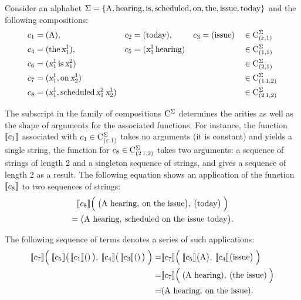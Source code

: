 \documentclass[../../document.tex]{subfiles}
\begin{document}
    \begin{example}\label{ex:lcfrs:comp}
        Consider an alphabet \(\Sigma=\{\text{A}, \text{hearing}, \text{is}, \text{scheduled}, \text{on}, \text{the}, \text{issue}, \text{today}\}\) and the following compositions:
        \begin{align*}
            c_1 &= (\text{A}), & c_2 &= (\text{today}), & c_3 &= (\text{issue}) && \in \mathrm{C}^\Sigma_{(\varepsilon, 1)} \\
            c_4 &= (\text{the} \, \textsl{x}_1^1), & c_5 &= (\textsl{x}_1^1 \, \text{hearing}) & & && \in \mathrm{C}^\Sigma_{(1,1)} \\
            c_6 &= (\textsl{x}_1^1 \, \text{is} \, \textsl{x}_1^2) && && && \in \mathrm{C}^\Sigma_{(2,1)} \\
            c_7 &= (\textsl{x}_1^1, \text{on} \, \textsl{x}_2^1) && && && \in \mathrm{C}^\Sigma_{(1\,1,2)}   \\
            c_8 &= (\textsl{x}_1^1, \text{scheduled} \, \textsl{x}_1^2 \, \textsl{x}_2^1) && && && \in \mathrm{C}^\Sigma_{(2\,1,2)}
        \end{align*}

        The subscript in the family of compositions \(\mathrm{C}^\Sigma\) determines the arities as well as the shape of arguments for the associated functions.
        For instance, the function \(\llbracket c_1\rrbracket\) associated with \(c_1 \in \mathrm{C}^\Sigma_{(\varepsilon, 1)}\) takes no arguments (it is constant) and yields a single string,
        the function for \(c_8 \in \mathrm{C}^\Sigma_{(2\,1, 2)}\) takes two arguments: a sequence of strings of length 2 and a singleton sequence of strings, and gives a sequence of length 2 as a result.
        The following equation shows an application of the function \(\llbracket c_8\rrbracket\) to two sequences of strings: 
        \begin{multline*}
            \llbracket c_8\rrbracket\Big( \; \big( \text{A hearing}, \: \text{on the issue} \big), \, \big( \text{today} \big) \; \Big)
            \\= \big( \text{A hearing}, \: \text{scheduled on the issue today} \big) \text{.}
        \end{multline*}

        The following sequence of terms denotes a series of such applications:
        \begin{align*}
            \llbracket c_7\rrbracket\Big( \; \llbracket c_5\rrbracket\big(\,\llbracket c_1\rrbracket()\,\big), \: \llbracket c_4\rrbracket\big(\,\llbracket c_3\rrbracket()\,\big) \; \Big)
            =& \llbracket c_7\rrbracket\Big( \; \llbracket c_5\rrbracket\big(\text{A}\big), \: \llbracket c_4\rrbracket\big(\text{issue}\big) \; \Big) \\
            =& \llbracket c_7\rrbracket\Big( \; (\text{A hearing}), \: (\text{the issue}) \; \Big) \\
            =& (\text{A hearing}, \: \text{on the issue}) \text{.}
        \end{align*}
    \end{example}
\end{document}
